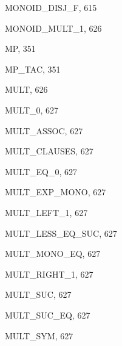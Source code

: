 \begin{theindex}
  \item {\ptt MONOID\_DISJ\_F}, 615
  \item {\ptt MONOID\_MULT\_1}, 626
  \item {\ptt MP}, 351
  \item {\ptt MP\_TAC}, 351
  \item {\ptt MULT}, 626
  \item {\ptt MULT\_0}, 627
  \item {\ptt MULT\_ASSOC}, 627
  \item {\ptt MULT\_CLAUSES}, 627
  \item {\ptt MULT\_EQ\_0}, 627
  \item {\ptt MULT\_EXP\_MONO}, 627
  \item {\ptt MULT\_LEFT\_1}, 627
  \item {\ptt MULT\_LESS\_EQ\_SUC}, 627
  \item {\ptt MULT\_MONO\_EQ}, 627
  \item {\ptt MULT\_RIGHT\_1}, 627
  \item {\ptt MULT\_SUC}, 627
  \item {\ptt MULT\_SUC\_EQ}, 627
  \item {\ptt MULT\_SYM}, 627

  \indexspace


\end{theindex}

